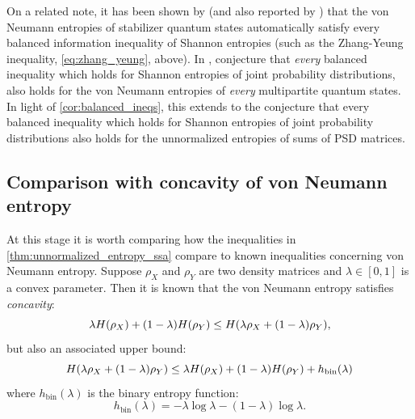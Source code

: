 \documentclass[notitlepage, 10pt]{article}
\begin{document}
\begin{rem}
    On a related note, it has been shown by \citeauthor{gross2013stabilizer} \cite{gross2013stabilizer} (and also reported by \citeauthor{linden2013quantum} \cite{linden2013quantum}) that the von Neumann entropies of stabilizer quantum states automatically satisfy every balanced information inequality of Shannon entropies (such as the Zhang-Yeung inequality, \cref{eq:zhang_yeung}, above).
    In \cite{cadney2012infinitely}, \citeauthor{cadney2012infinitely} conjecture that \textit{every} balanced inequality which holds for Shannon entropies of joint probability distributions, also holds for the von Neumann entropies of \textit{every} multipartite quantum states.
    In light of \cref{cor:balanced_ineqs}, this extends to the conjecture that every balanced inequality which holds for Shannon entropies of joint probability distributions also holds for the unnormalized entropies of sums of PSD matrices. 
\end{rem}

\subsection{Comparison with concavity of von Neumann entropy}
\label{sec:unent_concavity}
At this stage it is worth comparing how the inequalities in \cref{thm:unnormalized_entropy_ssa} compare to known inequalities concerning von Neumann entropy.
Suppose $\rho_X$ and $\rho_Y$ are two density matrices and $\lambda \in [0,1]$ is a convex parameter.
Then it is known that the von Neumann entropy satisfies \textit{concavity}:
\begin{equation}
    \lambda H(\rho_X) + (1-\lambda) H(\rho_Y) \leq  H(\lambda\rho_X + (1-\lambda) \rho_Y),
\end{equation}
but also an associated upper bound:
\begin{equation}
    H(\lambda\rho_X + (1-\lambda) \rho_Y) \leq \lambda H(\rho_X) + (1-\lambda) H(\rho_Y) + h_{\mathrm{bin}}(\lambda)
\end{equation}
where $h_{\mathrm{bin}}(\lambda)$ is the binary entropy function:
\begin{equation}
    h_{\mathrm{bin}}(\lambda) = -\lambda \log \lambda - (1-\lambda) \log \lambda.
\end{equation}
\end{document}
